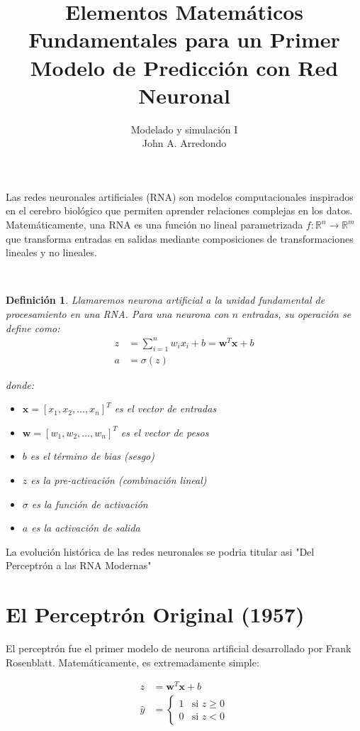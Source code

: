 \documentclass[12pt]{article}
\title{Elementos Matemáticos Fundamentales para un Primer Modelo de Predicción con Red Neuronal}
\author{Modelado y simulación I\\
John A. Arredondo }
\date{}
\newtheorem {definition}{Definición}
\begin{document}
\maketitle


Las redes neuronales artificiales (RNA) son modelos computacionales inspirados en el cerebro biológico que permiten aprender relaciones complejas en los datos. Matemáticamente, una RNA es una función no lineal parametrizada $f: \mathbb{R}^n \to \mathbb{R}^m$ que transforma entradas en salidas mediante composiciones de transformaciones lineales y no lineales.

\,

\begin{definition} Llamaremos neurona artificial a la unidad fundamental de procesamiento en una RNA. Para una neurona con $n$ entradas, su operación se define como:
%
\begin{align}
z &= \sum_{i=1}^{n} w_i x_i + b = \mathbf{w}^T \mathbf{x} + b \\
a &= \sigma(z)
\end{align}

donde:
\begin{itemize}
\item $\mathbf{x} = [x_1, x_2, \dots, x_n]^T$ es el vector de entradas
\item $\mathbf{w} = [w_1, w_2, \dots, w_n]^T$ es el vector de pesos
\item $b$ es el término de bias (sesgo)
\item $z$ es la pre-activación (combinación lineal)
\item $\sigma$ es la función de activación
\item $a$ es la activación de salida
\end{itemize}
\end{definition}

La evolución histórica de las redes neuronales se podria titular asi "Del Perceptrón a las RNA Modernas"

\section{El Perceptrón Original (1957)}

El perceptrón fue el primer modelo de neurona artificial desarrollado por Frank Rosenblatt. Matemáticamente, es extremadamente simple:

\begin{align}
z &= \mathbf{w}^T \mathbf{x} + b \\
\hat{y} &= 
\begin{cases} 
1 & \text{si } z \geq 0 \\
0 & \text{si } z < 0
\end{cases}
\end{align}
\end{document}
